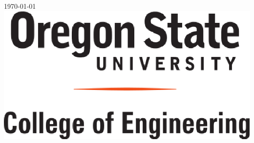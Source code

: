 \documentclass[letterpaper,11pt,notitlepage,fleqn]{article}
\begin{document}
\begin{titlepage}

    {\large \today}\\[3cm] %


    \includegraphics[scale=0.5]{coe.eps}\\[1cm] %


    \vfill %



\end{titlepage}

\tableofcontents
\newpage
\end{document}
